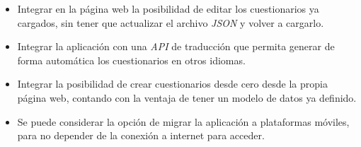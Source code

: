 \begin{itemize}
	\item Integrar en la página web la posibilidad de editar los cuestionarios ya cargados, sin tener que actualizar el archivo \textit{JSON} y volver a cargarlo.
	\item Integrar la aplicación con una \textit{API} de traducción que permita generar de forma automática los cuestionarios en otros idiomas.
	\item Integrar la posibilidad de crear cuestionarios desde cero desde la propia página web, contando con la ventaja de tener un modelo de datos ya definido.
	\item Se puede considerar la opción de migrar la aplicación a plataformas móviles, para no depender de la conexión a internet para acceder.
\end{itemize}


